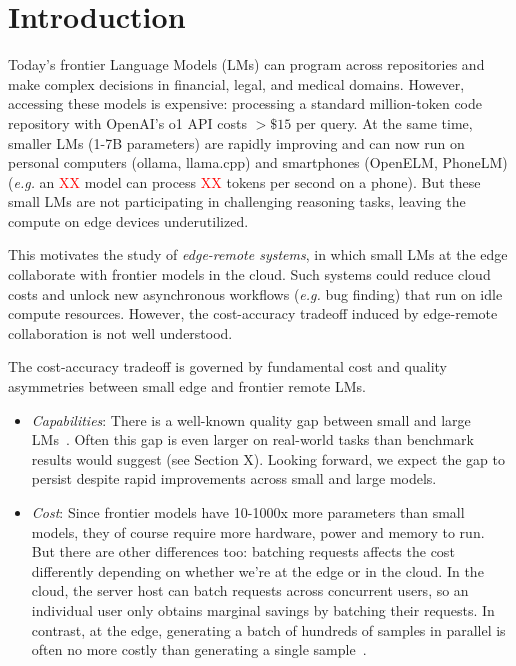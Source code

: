\section{Introduction}
\label{sec:intro}
Today's frontier Language Models (LMs) can program across repositories and make complex decisions in financial, legal, and medical domains. However, accessing these models is expensive: processing a standard million-token code repository with OpenAI's o1 API costs $>\$15$ per query. 
% 
At the same time, smaller LMs (1-7B parameters) are rapidly improving and can now run on personal computers (ollama, llama.cpp) and smartphones (OpenELM, PhoneLM)  (\textit{e.g.} an \textcolor{red}{XX} model can process \textcolor{red}{XX} tokens per second on a phone). But these small LMs are not participating in challenging reasoning tasks, leaving the compute on edge devices underutilized.

This motivates the study of \emph{edge-remote systems}, in which small LMs at the edge collaborate with frontier models in the cloud. Such systems could reduce cloud costs and unlock new asynchronous workflows (\textit{e.g.} bug finding) that run on idle compute resources. However, the cost-accuracy tradeoff induced by edge-remote collaboration is not well understood. 

The cost-accuracy tradeoff is governed by fundamental cost and quality asymmetries between small edge and frontier remote LMs. 

\begin{itemize}
    \item \emph{Capabilities}: There is a well-known quality gap between small and large LMs~\cite{kaplan2020scaling}. Often this gap is even larger on real-world tasks than benchmark results would suggest (see Section X). Looking forward, we expect the gap to persist despite rapid improvements across small and large models.

    \item \emph{Cost}: Since frontier models have 10-1000x more parameters than small models, they of course require more hardware, power and memory to run. But there are other differences too: batching requests affects the cost differently depending on whether we're at the edge or in the cloud. In the cloud, the server host can batch requests across concurrent users, so an individual user only obtains marginal savings by batching their requests. In contrast, at the edge, generating a batch of hundreds of samples in parallel is often no more costly than generating a single sample~\cite{leviathan2023fast}. 
\end{itemize}

